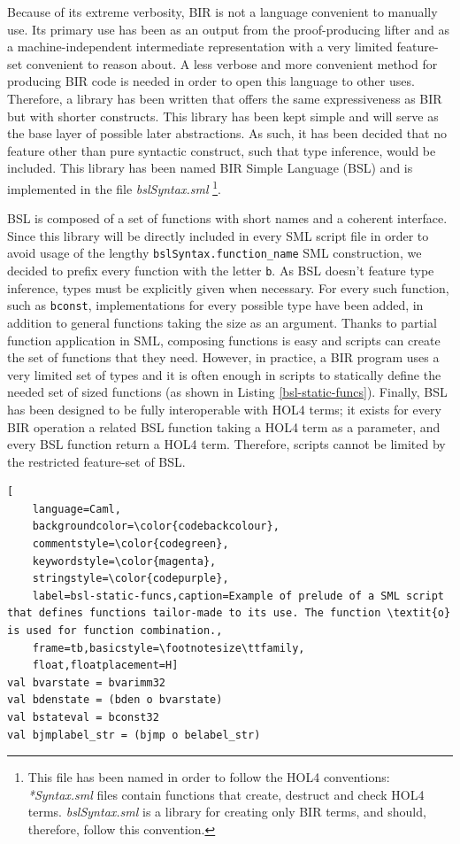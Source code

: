 \documentclass{kththesis}
\begin{document}
{Because of its extreme verbosity, BIR is not a language convenient to manually use. Its primary use has been as an output from the \gls{proof-producing} lifter and as a machine-independent intermediate representation with a very limited feature-set convenient to reason about. A less verbose and more convenient method for producing BIR code is needed in order to open this language to other uses. Therefore, a library has been written that offers the same expressiveness as BIR but with shorter constructs. This library has been kept simple and will serve as the base layer of possible later abstractions. As such, it has been decided that no feature other than pure syntactic construct, such that type inference, would be included. This library has been named BIR Simple Language (BSL) and is implemented in the file \textit{bslSyntax.sml} \footnote{This file has been named in order to follow the HOL4 conventions: \textit{*Syntax.sml} files contain functions that create, destruct and check HOL4 terms. \textit{bslSyntax.sml} is a library for creating only BIR terms, and should, therefore, follow this convention.}.

BSL is composed of a set of functions with short names and a coherent interface. Since this library will be directly included in every \gls{SML} script file in order to avoid usage of the lengthy \texttt{bslSyntax.function\_name} SML construction, we decided to prefix every function with the letter \texttt{b}. As BSL doesn't feature type inference, types must be explicitly given when necessary. For every such function, such as \texttt{bconst}, implementations for every possible type have been added, in addition to general functions taking the size as an argument. Thanks to partial function application in SML, composing functions is easy and scripts can create the set of functions that they need. However, in practice, a BIR program uses a very limited set of types and it is often enough in scripts to statically define the needed set of sized functions (as shown in Listing \ref{bsl-static-funcs}). Finally, BSL has been designed to be fully interoperable with HOL4 terms; it exists for every BIR operation a related BSL function taking a HOL4 term as a parameter, and every BSL function return a HOL4 term. Therefore, scripts cannot be limited by the restricted feature-set of BSL.

\begin{lstlisting}[
    language=Caml,
    backgroundcolor=\color{codebackcolour},
    commentstyle=\color{codegreen},
    keywordstyle=\color{magenta},
    stringstyle=\color{codepurple},
    label=bsl-static-funcs,caption=Example of prelude of a SML script that defines functions tailor-made to its use. The function \textit{o} is used for function combination.,
    frame=tb,basicstyle=\footnotesize\ttfamily,
    float,floatplacement=H]
val bvarstate = bvarimm32
val bdenstate = (bden o bvarstate)
val bstateval = bconst32
val bjmplabel_str = (bjmp o belabel_str)
\end{lstlisting}

}
\end{document}
